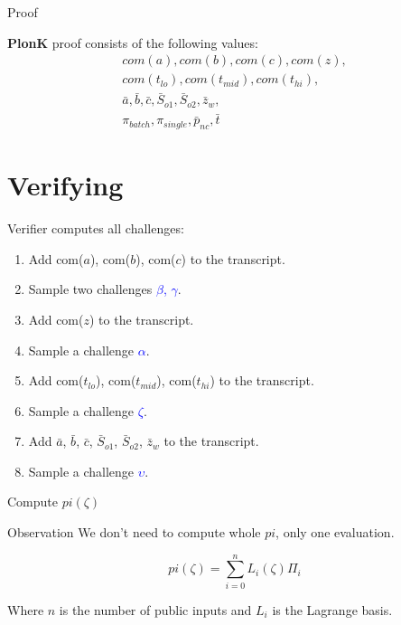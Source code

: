 \documentclass{zkdl-presentation-template}
\begin{document}
    \begin{frame} {Proof}
        \begin{definition}
            \textbf{PlonK} proof consists of the following values:
            \begin{align*}
                com(a), com(b), com(c), com(z), \\ 
                com(t_{lo}), com(t_{mid}), com(t_{hi}), \\ 
                \bar{a}, \bar{b}, \bar{c}, \bar{S}_{o1}, \bar{S}_{o2}, \bar{z}_w, \\
                \pi_{batch}, \pi_{single}, \bar{p}_{nc}, \bar{t}
            \end{align*}
        \end{definition}
    \end{frame}

    \section{Verifying}

    \begin{frame} {Verifier computes all challenges:}
        \begin{enumerate}
            \item Add com($a$), com($b$), com($c$) to the transcript.
            \item Sample two challenges \textcolor{blue}{$\beta$, $\gamma$}.
            \item Add com($z$) to the transcript.
            \item Sample a challenge \textcolor{blue}{$\alpha$}.
            \item Add com($t_{lo}$), com($t_{mid}$), com($t_{hi}$) to the transcript.
            \item Sample a challenge \textcolor{blue}{$\zeta$}.
            \item Add $\bar{a}$, $\bar{b}$, $\bar{c}$, $\bar{S}_{o1}$, $\bar{S}_{o2}$, $\bar{z}_w$ to the transcript.
            \item Sample a challenge \textcolor{blue}{$\upsilon$}.
        \end{enumerate}
    \end{frame}

    \begin{frame} {Compute $pi(\zeta)$}
        \begin{block}{Observation}
            We don't need to compute whole $pi$, only one evaluation.
        \end{block}

        \begin{equation*}
            pi(\zeta) = \sum_{i=0}^{n} L_{i}(\zeta) \Pi_i
        \end{equation*}
        
        Where $n$ is the number of public inputs and $L_i$ is the Lagrange basis.
    \end{frame}
\end{document}
